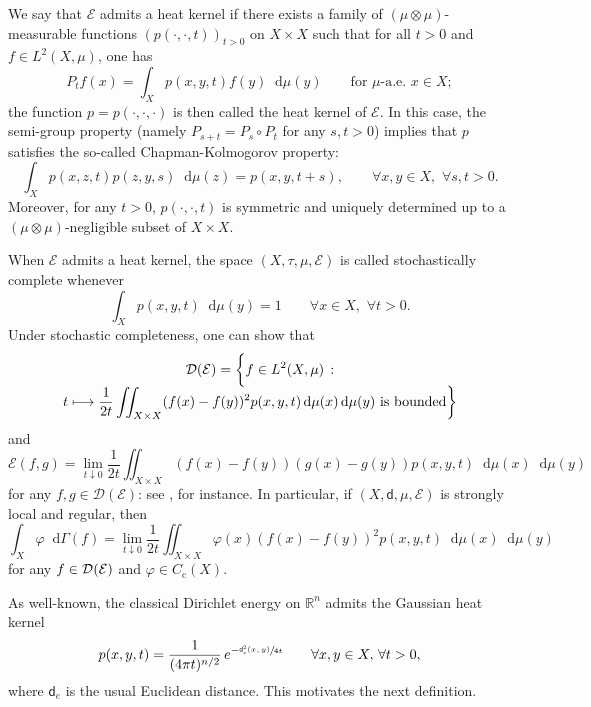 \documentclass[10pt]{amsart}
\newcommand\mto{\mathchoice{\longmapsto}{\mapsto}{\mapsto}{\mapsto}}
\newcommand{\rmc}{\mathrm{c}}
\newcommand{\NoChangel}[1]{%
\expandafter\let\csname old\string#1\endcsname=#1
\let#1=\relax
\newcommand{#1}{\mathcode`l="716C\csname old\string#1\endcsname\mathcode`l="7160 }%
}
\theoremstyle{plain}
\theoremstyle{definition}
\newcommand{\setR}{\mathbb{R}}
\newcommand{\cE}{\mathcal{E}}
\newcommand{\cD}{\mathcal{D}}
\let\phi\varphi
\newcommand{\di}{\mathop{}\!\mathrm{d}}
\newcommand{\loc}{\mathrm{loc}}\NoChangel{\loc}
\newcommand{\dist}{\mathsf{d}}
\begin{document}
We say that $\cE$ admits a heat kernel if there exists a family of $(\mu \otimes \mu)$-measurable functions $(p(\cdot, \cdot, t))_{t>0}$ on $X\times X$ such that for all $t>0$ and $f\in L^2(X,\mu)$, one has
\[
P_t f (x) = \int_X p(x,y,t) f(y) \di \mu(y) \qquad \text{for $\mu$-a.e.\ $x \in X$};
\]
the function $p=p(\cdot,\cdot,\cdot)$ is then called the heat kernel of $\cE$.
In this case, the semi-group property (namely $P_{s+t}=P_s \circ P_t$ for any $s,t>0$) implies that $p$ satisfies the so-called Chapman-Kolmogorov property:
\begin{equation}\label{eq:ChapmanKolmogorov}
\int_X p(x,z,t)p(z,y,s) \di \mu(z) = p(x,y,t+s), \qquad \forall x,y \in X, \, \, \forall s,t>0.
\end{equation}
Moreover, for any $t>0$, $p(\cdot,\cdot,t)$ is symmetric and uniquely determined up to a $(\mu\otimes \mu)$-negligible subset of $X\times X$.

When $\cE$ admits a heat kernel, the space $(X,\tau,\mu,\cE)$ is called stochastically complete whenever\vspace*{-3pt}
\[
\int_X p(x,y,t) \di \mu(y) = 1 \qquad \forall x \in X,\, \, \forall t >0.
\]
Under stochastic completeness, one can show that\vspace*{-4pt}
\begin{multline}\label{eq:Grigoryan}
\cD(\cE)= \biggl\{f \in L^2(X,\mu) \,: \\[-5pt]
t \mto \frac{1}{2t} \iint_{X\times X} (f(x)-f(y))^2 p(x,y,t) \di \mu(x) \di \mu(y) \, \, \text{is bounded} \biggr\}
\end{multline}
and\vspace*{-3pt}
\[
\cE(f,g) = \lim_{t \downarrow 0} \frac{1}{2t} \iint_{X\times X} (f(x)-f(y))(g(x)-g(y)) p(x,y,t) \di \mu(x) \di \mu(y)
\]
for any $f, g \in \cD(\cE)$: see \cite[2.2]{Grigor'yan}, for instance. In particular, if $(X,\dist,\mu,\cE)$ is strongly local and regular, then
\begin{equation}\label{eq:Grigor'yan2}
\int_X \phi \di \Gamma(f) = \lim_{t \downarrow 0} \frac{1}{2t} \iint_{X\times X} \phi(x)(f(x)-f(y))^2 p(x,y,t) \di \mu(x) \di \mu(y)
\end{equation}
for any $f \in \cD_{\loc}(\cE)$ and $\phi \in C_\rmc(X)$.

As well-known, the classical Dirichlet energy on $\setR^n$ admits the Gaussian heat kernel
\[
p(x,y,t) = \frac{1}{(4 \pi t)^{n/2}}\, e^{-\sfrac{\dist_e^2(x,y)}{4t}} \qquad \forall x,y \in X, \, \forall t >0,
\]
where $\dist_e$ is the usual Euclidean distance. This motivates the next definition.
\end{document}
